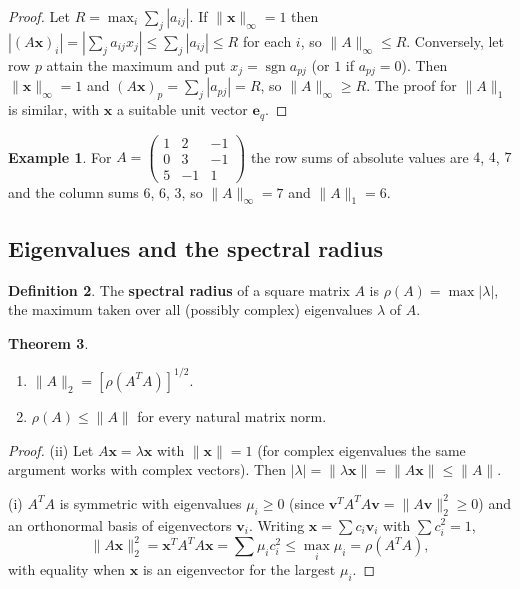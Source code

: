 \documentclass[11pt,a4paper]{article}
\numberwithin{equation}{section}
\DeclareMathOperator{\sgn}{sgn}
\theoremstyle{definition}
\newtheorem{thm}{Theorem}[subsection]
\newtheorem{defn}[thm]{Definition}
\newtheorem{exa}[thm]{Example}
\begin{document}
\begin{proof}
Let $R = \max_i\sum_j|a_{ij}|$. If $\|\mathbf x\|_\infty = 1$ then $|(A\mathbf x)_i| = \left|\sum_ja_{ij}x_j\right|\leq\sum_j|a_{ij}|\leq R$ for each $i$, so
$\|A\|_\infty\leq R$. Conversely, let row $p$ attain the maximum and put $x_j = \sgn a_{pj}$ (or $1$ if $a_{pj} = 0$). Then $\|\mathbf x\|_\infty = 1$
and $(A\mathbf x)_p = \sum_j|a_{pj}| = R$, so $\|A\|_\infty\geq R$. The proof for $\|A\|_1$ is similar, with $\mathbf x$ a suitable unit vector
$\mathbf e_q$.
\end{proof}

\begin{exa}
For $A = \begin{pmatrix}1&2&-1\\0&3&-1\\5&-1&1\end{pmatrix}$ the row sums of absolute values are $4$, $4$, $7$ and the column sums $6$, $6$, $3$,
so $\|A\|_\infty = 7$ and $\|A\|_1 = 6$.
\end{exa}


\subsection{Eigenvalues and the spectral radius}
\label{sec:spectral}

\begin{defn}
The \textbf{spectral radius} of a square matrix $A$ is $\rho(A) = \max|\lambda|$, the maximum taken over all (possibly complex) eigenvalues
$\lambda$ of $A$.
\end{defn}

\begin{thm}
\label{thm:spectral}
\begin{enumerate}
\item[(i)] $\|A\|_2 = \left[\rho(A^TA)\right]^{1/2}$.
\item[(ii)] $\rho(A)\leq\|A\|$ for every natural matrix norm.
\end{enumerate}
\end{thm}

\begin{proof}
(ii) Let $A\mathbf x = \lambda\mathbf x$ with $\|\mathbf x\| = 1$ (for complex eigenvalues the same argument works with complex vectors). Then
$|\lambda| = \|\lambda\mathbf x\| = \|A\mathbf x\|\leq\|A\|$.

(i) $A^TA$ is symmetric with eigenvalues $\mu_i\geq0$ (since $\mathbf v^TA^TA\mathbf v = \|A\mathbf v\|_2^2\geq0$) and an orthonormal basis of
eigenvectors $\mathbf v_i$. Writing $\mathbf x = \sum c_i\mathbf v_i$ with $\sum c_i^2 = 1$,
$$\|A\mathbf x\|_2^2 = \mathbf x^TA^TA\mathbf x = \sum\mu_ic_i^2\leq\max_i\mu_i = \rho(A^TA),$$
with equality when $\mathbf x$ is an eigenvector for the largest $\mu_i$.
\end{proof}
\end{document}
